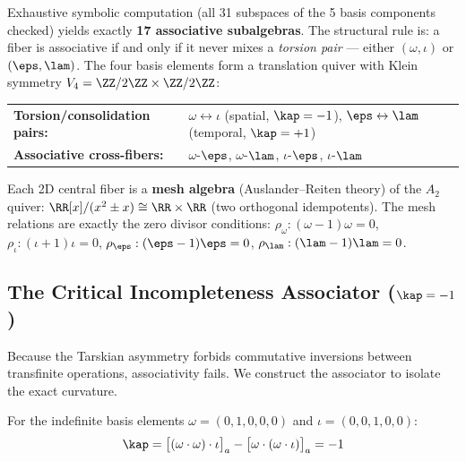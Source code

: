 \begin{remark}\label{rem:fiber-lattice}
Exhaustive symbolic computation (all 31 subspaces of the 5 basis components checked) yields exactly \textbf{17 associative subalgebras}. The structural rule is: a fiber is associative if and only if it never mixes a \emph{torsion pair} --- either $(\omega, \iota)$ or $(\eps, \lam)$. The four basis elements form a translation quiver with Klein symmetry $V_4 = \ZZ/2\ZZ \times \ZZ/2\ZZ$:
\begin{center}
\begin{tabular}{ll}
\textbf{Torsion/consolidation pairs:} & $\omega \leftrightarrow \iota$ (spatial, $\kap = -1$), \quad $\eps \leftrightarrow \lam$ (temporal, $\kap = +1$) \\
\textbf{Associative cross-fibers:} & $\omega$-$\eps$, $\omega$-$\lam$, $\iota$-$\eps$, $\iota$-$\lam$
\end{tabular}
\end{center}
Each 2D central fiber is a \textbf{mesh algebra} (Auslander--Reiten theory) of the $A_2$ quiver: $\RR[x]/(x^2 \pm x) \cong \RR \times \RR$ (two orthogonal idempotents). The mesh relations are exactly the zero divisor conditions: $\rho_\omega : (\omega - 1)\omega = 0$, $\rho_\iota : (\iota + 1)\iota = 0$, $\rho_\eps : (\eps - 1)\eps = 0$, $\rho_\lam : (\lam - 1)\lam = 0$.
\end{remark}


\subsection{The Critical Incompleteness Associator ($\kap = -1$)}\label{sec:curvature}

Because the Tarskian asymmetry forbids commutative inversions between transfinite operations, associativity fails. We construct the associator to isolate the exact curvature.

\begin{theorem}\label{thm:associator}\label{thm:curvature}
For the indefinite basis elements $\omega = (0,1,0,0,0)$ and $\iota = (0,0,1,0,0)$:
$$\kap = \bigl[(\omega \cdot \omega) \cdot \iota\bigr]_a - \bigl[\omega \cdot (\omega \cdot \iota)\bigr]_a = -1$$
\end{theorem}

